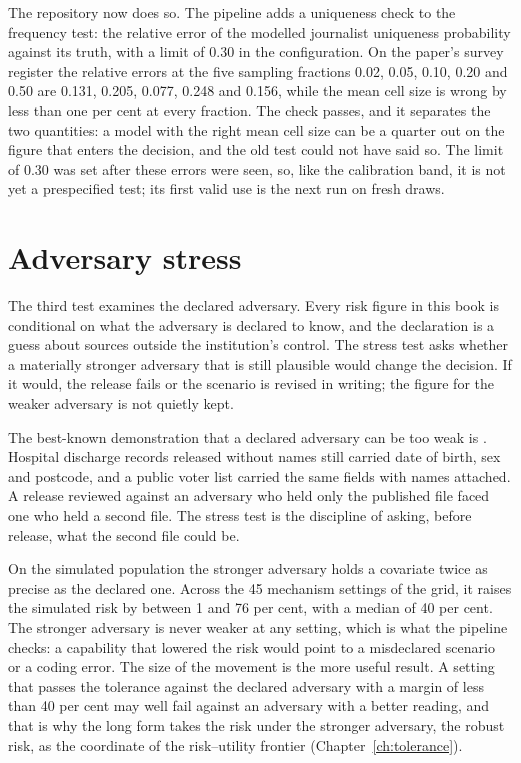 The repository now does so. The pipeline adds a uniqueness check to the frequency test:
the relative error of the modelled journalist uniqueness probability against its truth,
with a limit of 0.30 in the configuration. On the paper's survey register the relative
errors at the five sampling fractions 0.02, 0.05, 0.10, 0.20 and 0.50 are 0.131, 0.205,
0.077, 0.248 and 0.156, while the mean cell size is wrong by less than one per cent at
every fraction. The check passes, and it separates the two quantities: a model with the
right mean cell size can be a quarter out on the figure that enters the decision, and the
old test could not have said so.
The limit of 0.30 was set after these errors were seen, so, like the calibration band, it
is not yet a prespecified test; its first valid use is the next run on fresh draws.

\section{Adversary stress}

The third test examines the declared adversary. Every risk figure in this book is
conditional on what the adversary is declared to know, and the declaration is a
guess about sources outside the institution's control. The stress test asks
whether a materially stronger adversary that is still plausible would change the
decision. If it would, the release fails or the scenario is revised in writing; the
figure for the weaker adversary is not quietly kept.

The best-known demonstration that a declared adversary can be too weak is
\citet{sweeney2000}. Hospital discharge records released without names still
carried date of birth, sex and postcode, and a public voter list carried the same
fields with names attached. A release reviewed against an adversary who held only
the published file faced one who held a second file. The stress test is the
discipline of asking, before release, what the second file could be.

On the simulated population the stronger adversary holds a covariate twice as
precise as the declared one. %
Across the 45 mechanism settings of the grid, it raises the simulated risk by between
1 and 76 per cent, with a median of 40 per cent.
The stronger adversary is never weaker at any setting, which is what the pipeline
checks: a capability that lowered the risk would point to a misdeclared scenario or
a coding error. The size of the movement is the more useful result. A setting that
passes the tolerance against the declared adversary with a margin of less than 40
per cent may well fail against an adversary with a better reading, and that is why
the long form takes the risk under the stronger adversary, the robust risk, as the
coordinate of the risk--utility frontier (Chapter~\ref{ch:tolerance}).

